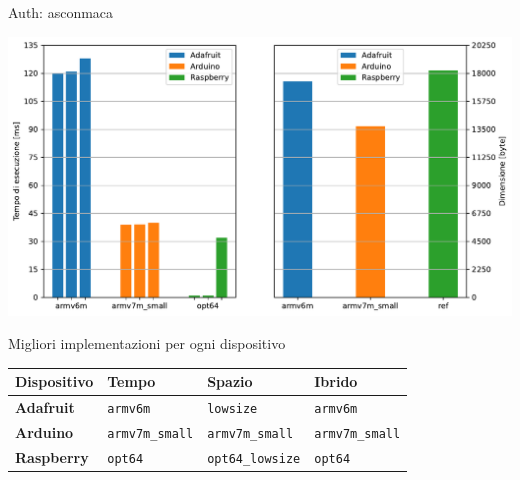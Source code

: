 \begin{frame}{Auth: asconmaca}

    \begin{center}
        \includegraphics[height=0.40\textwidth]{images/auth.pdf}
    \end{center}
    
\end{frame}


\begin{frame}{Migliori implementazioni per ogni dispositivo}

    \begin{table}
        \centering
    	\begin{tabular}{|m{}<{\centering}||m{}<{\centering}|m{}<{\centering}|m{}<{\centering}|}
    		\hline
    		\textbf{Dispositivo} & \textbf{Tempo} & \textbf{Spazio} & \textbf{Ibrido} \\
            \hline \hline
            \textbf{Adafruit} & \texttt{armv6m} & \texttt{lowsize} & \texttt{armv6m} \\
            \hline
            \textbf{Arduino} & \texttt{armv7m\_small} & \texttt{armv7m\_small} & \texttt{armv7m\_small} \\
    		\hline
            \textbf{Raspberry} & \texttt{opt64} & \texttt{opt64\_lowsize} & \texttt{opt64} \\
            \hline
        \end{tabular}
    \end{table}

\end{frame}
